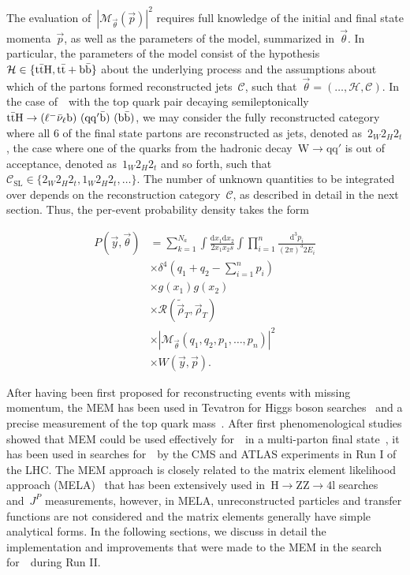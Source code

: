 The evaluation of~$|\mathcal{M}_{\vec{\theta}}(\vec{p})|^2$ requires full knowledge of the initial and final state momenta~$\vec{p}$, as well as the parameters of the model, summarized in~$\vec{\theta}$. In particular, the parameters of the model consist of the hypothesis~$\mathcal{H} \in \{\mathrm{t} \bar{\mathrm{t}} \mathrm{H}, \mathrm{t} \bar{\mathrm{t}} + \mathrm{b}\bar{\mathrm{b}}\}$ about the underlying process and the assumptions about which of the partons formed reconstructed jets~$\mathcal{C}$, such that~$\vec{\theta} = (\dots, \mathcal{H}, \mathcal{C})$. In the case of~\ttH~with the top quark pair decaying semileptonically~$\mathrm{t} \bar{\mathrm{t}} \mathrm{H} \rightarrow (\ell^- \bar{\mathrm{\nu}}_\ell \mathrm{b})\ (\mathrm{q} \mathrm{q}' \bar{\mathrm{b}})\ (\mathrm{b} \bar{\mathrm{b}})$, we may consider the fully reconstructed category where all 6 of the final state partons are reconstructed as jets, denoted as~$2_W 2_H 2_t$, the case where one of the quarks from the hadronic decay~$\mathrm{W} \rightarrow \mathrm{q} \mathrm{q}'$ is out of acceptance, denoted as~$1_W 2_H 2_t$ and so forth, such that~$\mathcal{C}_{\mathrm{SL}} \in \{ 2_W 2_H 2_t, 1_W 2_H 2_t, \dots \}$. The number of unknown quantities to be integrated over depends on the reconstruction category~$\mathcal{C}$, as described in detail in the next section. 
Thus, the per-event probability density takes the form

\begin{align}
\label{eq:mem_definition}
P(\vec{y}, \vec{\theta}) &= \sum_{k=1}^{N_a} \int \frac{\mathrm{d}x_1 \mathrm{d}x_2}{2 x_1 x_2 s} \int \prod_{i=1}^{n} \frac{\mathrm{d}^3 p_i}{(2\pi)^3 2 E_i} \\
&\times \delta^4 (q_1 + q_2 - \sum_{i=1}^n p_i)\\
&\times g(x_1) g(x_2) \\ 
&\times \mathcal{R}(\tilde{\vec{\rho}}_T, \vec{\rho}_T) \\ 
&\times |\mathcal{M}_{\vec{\theta}}(q_1, q_2, p_1, \dots, p_n)|^2 \\
&\times W(\vec{y}, \vec{p}).
\end{align}

After having been first proposed for reconstructing events with missing momentum\cite{Kondo:1988yd}, the MEM has been used in Tevatron for Higgs boson searches~\cite{Aaltonen:2009dh,Aaltonen:2011rt} and a precise measurement of the top quark mass~\cite{D0topmass2004}. After first phenomenological studies showed that MEM could be used effectively for~\ttH~in a multi-parton final state~\cite{Artoisenet:2013vfa}, it has been used in searches for~\ttHbb~by the CMS and ATLAS experiments in Run I of the LHC\cite{Aad:2015gra,Khachatryan:2015ila}. The MEM approach is closely related to the matrix element likelihood approach (MELA)~\cite{Gao:2010qx} that has been extensively used in~$\mathrm{H} \rightarrow \mathrm{ZZ} \rightarrow 4\mathrm{l}$ searches and~$J^P$ measurements, however, in MELA, unreconstructed particles and transfer functions are not considered and the matrix elements generally have simple analytical forms.
In the following sections, we discuss in detail the implementation and improvements that were made to the MEM in the search for~\ttHbb~during Run II.

